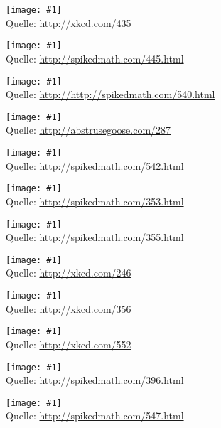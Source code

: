 \documentclass[a4paper,ngerman,landscape]{scrartcl}
\newcommand{\comic}[3]{\begin{center}
  \texttt{[image: \#1]} \\[2em]

  Quelle: \url{#2}
\end{center}\newpage}
\begin{document}
\comic{purity.png}{http://xkcd.com/435}{0.8}
\comic{three-logicians.png}{http://spikedmath.com/445.html}{1.4}
\comic{540-adventures-of-martin.png}{http://http://spikedmath.com/540.html}{1.4}
\comic{this_is_what_my_room_looks_like_when_i_draw}{http://abstrusegoose.com/287}{0.4}
\comic{542-science-vs-math}{http://spikedmath.com/542.html}{1.4}
\comic{353-fortune-teller-1}{http://spikedmath.com/353.html}{1.4}
\comic{355-fortune-teller-3}{http://spikedmath.com/355.html}{1.4}
\comic{labyrinth_puzzle}{http://xkcd.com/246}{2.7}
\comic{nerd_sniping}{http://xkcd.com/356}{0.8}
\comic{correlation}{http://xkcd.com/552}{1.6}
\comic{homer}{http://spikedmath.com/396.html}{2.4}
\comic{547-the-perfect-score}{http://spikedmath.com/547.html}{1.3}
\end{document}
